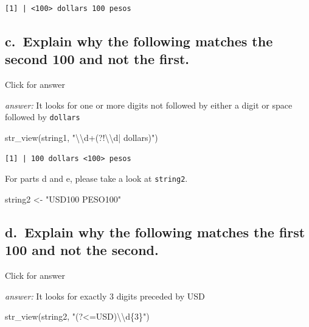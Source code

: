 \documentclass[
]{book}
\newenvironment{Shaded}{\begin{snugshade}}{\end{snugshade}}
\newcommand{\FunctionTok}[1]{\textcolor[rgb]{0.00,0.00,0.00}{#1}}
\newcommand{\NormalTok}[1]{#1}
\newcommand{\OtherTok}[1]{\textcolor[rgb]{0.56,0.35,0.01}{#1}}
\newcommand{\SpecialCharTok}[1]{\textcolor[rgb]{0.00,0.00,0.00}{#1}}
\newcommand{\StringTok}[1]{\textcolor[rgb]{0.31,0.60,0.02}{#1}}
\begin{document}
\begin{verbatim}
[1] | <100> dollars 100 pesos
\end{verbatim}

\hypertarget{c.-explain-why-the-following-matches-the-second-100-and-not-the-first.}{%
\subsection{c.~Explain why the following matches the second 100 and not the first.}\label{c.-explain-why-the-following-matches-the-second-100-and-not-the-first.}}

Click for answer

\emph{answer:} It looks for one or more digits not followed by either a digit or space followed by \texttt{dollars}

\begin{Shaded}
\begin{Highlighting}[]
\FunctionTok{str\_view}\NormalTok{(string1, }\StringTok{"}\SpecialCharTok{\textbackslash{}\textbackslash{}}\StringTok{d+(?!}\SpecialCharTok{\textbackslash{}\textbackslash{}}\StringTok{d| dollars)"}\NormalTok{)}
\end{Highlighting}
\end{Shaded}

\begin{verbatim}
[1] | 100 dollars <100> pesos
\end{verbatim}

For parts d and e, please take a look at \texttt{string2}.

\begin{Shaded}
\begin{Highlighting}[]
\NormalTok{string2 }\OtherTok{\textless{}{-}} \StringTok{"USD100 PESO100"}
\end{Highlighting}
\end{Shaded}

\hypertarget{d.-explain-why-the-following-matches-the-first-100-and-not-the-second.}{%
\subsection{d.~Explain why the following matches the first 100 and not the second.}\label{d.-explain-why-the-following-matches-the-first-100-and-not-the-second.}}

Click for answer

\emph{answer:} It looks for exactly 3 digits preceded by USD

\begin{Shaded}
\begin{Highlighting}[]
\FunctionTok{str\_view}\NormalTok{(string2, }\StringTok{"(?\textless{}=USD)}\SpecialCharTok{\textbackslash{}\textbackslash{}}\StringTok{d\{3\}"}\NormalTok{)}
\end{Highlighting}
\end{Shaded}
\end{document}
